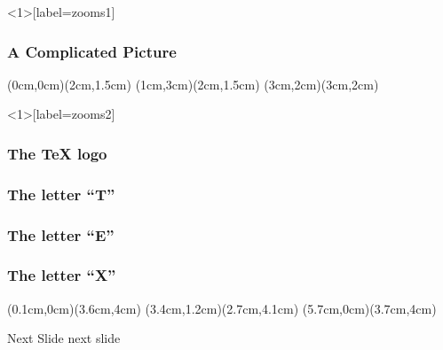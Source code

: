 \documentclass{beamer}
\begin{document}
\begin{frame}<1>[label=zooms1]
\frametitle<1>{A Complicated Picture}

(0cm,0cm)(2cm,1.5cm)
(1cm,3cm)(2cm,1.5cm)
(3cm,2cm)(3cm,2cm)



\end{frame}

\begin{frame}<1>[label=zooms2]
\frametitle<1>{The \TeX{} logo}
\frametitle<2>{The letter ``T''}
\frametitle<3>{The letter ``E''}
\frametitle<4>{The letter ``X''}
(0.1cm,0cm)(3.6cm,4cm)
(3.4cm,1.2cm)(2.7cm,4.1cm)
(5.7cm,0cm)(3.7cm,4cm)
{\scalebox{15}{\TeX}\\}
\end{frame}

\begin{frame}{Next Slide}
    next slide
\end{frame}


\end{document}
